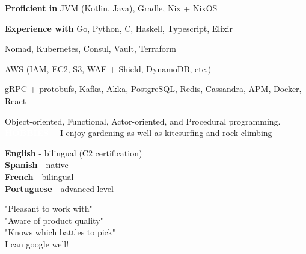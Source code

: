 \documentclass[9pt]{developercv}
\newcommand{\para}{\vspace{0.4em}}
\begin{document}
    \vspace{1em}
    \begin{minipage}[t]{0.62\textwidth}
        \vspace{-\baselineskip} %


        \vspace{-0.5em}
        \textbf{Proficient in} JVM (Kotlin, Java), Gradle, Nix + NixOS

        \para
        \textbf{Experience with}
        Go, Python, C, Haskell, Typescript, Elixir

        \para

        Nomad, Kubernetes, Consul, Vault, Terraform

        \para

        AWS (IAM, EC2, S3, WAF + Shield, DynamoDB, etc.)

        \para

        gRPC + protobufs, Kafka, Akka, PostgreSQL, Redis, Cassandra, APM, Docker, React

        \para

        Object-oriented, Functional, Actor-oriented, and Procedural programming.
        \\

        \colorbox{accent}{\textcolor{white}{\MakeUppercase{\textbf{Hobbies}}}}~~
        I enjoy gardening as well as kitesurfing and rock climbing
    \end{minipage}
    \hfill
    \begin{minipage}[t]{0.35\textwidth}
        \vspace{-\baselineskip} %

        \vspace{-0.5em}
        \textbf{English} - bilingual (C2 certification)\\
        \textbf{Spanish} - native\\
        \textbf{French} - bilingual\\
        \textbf{Portuguese} - advanced level\\


        \vspace{-0.5em}
        "Pleasant to work with"\\
        "Aware of product quality"\\
        "Knows which battles to pick"\\
        I can google well!
    \end{minipage}
    \vspace{1.2em}
    \hfill
%

\end{document}
